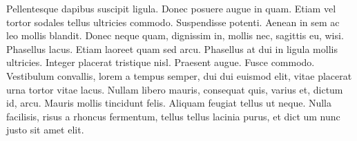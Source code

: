 Pellentesque dapibus suscipit ligula.  Donec posuere augue in quam.
Etiam vel tortor sodales tellus ultricies commodo.  Suspendisse
potenti.  Aenean in sem ac leo mollis blandit.  Donec neque quam,
dignissim in, mollis nec, sagittis eu, wisi.  Phasellus lacus.  Etiam
laoreet quam sed arcu.  Phasellus at dui in ligula mollis ultricies.
Integer placerat tristique nisl.  Praesent augue.  Fusce commodo.
Vestibulum convallis, lorem a tempus semper, dui dui euismod elit,
vitae placerat urna tortor vitae lacus.  Nullam libero mauris,
consequat quis, varius et, dictum id, arcu.  Mauris mollis tincidunt
felis.  Aliquam feugiat tellus ut neque.  Nulla facilisis, risus a
rhoncus fermentum, tellus tellus lacinia purus, et dict
um nunc justo sit amet elit.
